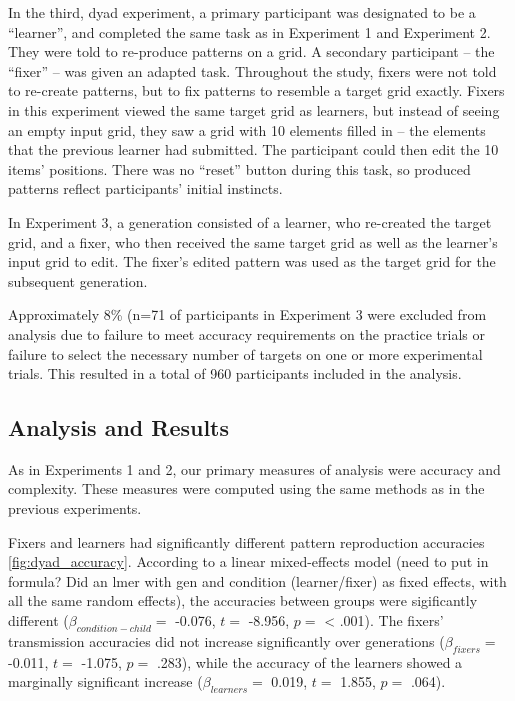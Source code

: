 \documentclass[10pt, letterpaper]{article}
\begin{document}
In the third, dyad experiment, a primary participant was designated to
be a ``learner'', and completed the same task as in Experiment 1 and
Experiment 2. They were told to re-produce patterns on a grid. A
secondary participant -- the ``fixer'' -- was given an adapted task.
Throughout the study, fixers were not told to re-create patterns, but to
fix patterns to resemble a target grid exactly. Fixers in this
experiment viewed the same target grid as learners, but instead of
seeing an empty input grid, they saw a grid with 10 elements filled in
-- the elements that the previous learner had submitted. The participant
could then edit the 10 items' positions. There was no ``reset'' button
during this task, so produced patterns reflect participants' initial
instincts.

In Experiment 3, a generation consisted of a learner, who re-created the
target grid, and a fixer, who then received the same target grid as well
as the learner's input grid to edit. The fixer's edited pattern was used
as the target grid for the subsequent generation.

Approximately 8\% (n=71 of participants in Experiment 3 were excluded
from analysis due to failure to meet accuracy requirements on the
practice trials or failure to select the necessary number of targets on
one or more experimental trials. This resulted in a total of 960
participants included in the analysis.

\subsection{Analysis and Results}\label{analysis-and-results}

As in Experiments 1 and 2, our primary measures of analysis were
accuracy and complexity. These measures were computed using the same
methods as in the previous experiments.

Fixers and learners had significantly different pattern reproduction
accuracies \ref{fig:dyad_accuracy}. According to a linear mixed-effects
model (need to put in formula? Did an lmer with gen and condition
(learner/fixer) as fixed effects, with all the same random effects), the
accuracies between groups were sigificantly different
(\(\beta_{condition-child} =\) -0.076, \(t =\) -8.956, \(p =\)
\textless{} .001). The fixers' transmission accuracies did not increase
significantly over generations (\(\beta_{fixers} =\) -0.011, \(t =\)
-1.075, \(p =\) .283), while the accuracy of the learners showed a
marginally significant increase (\(\beta_{learners} =\) 0.019, \(t =\)
1.855, \(p =\) .064).
\end{document}
